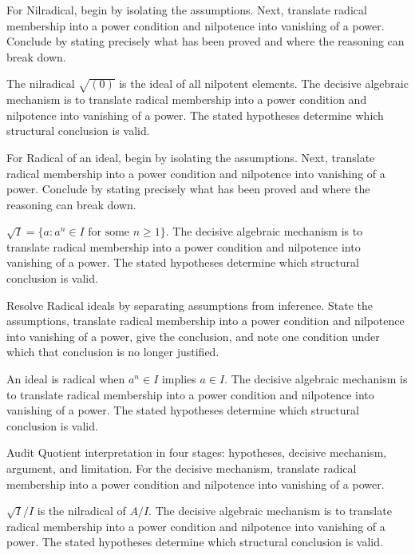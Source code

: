 \begin{problem}\label{prob:v03-problem-02}
For Nilradical, begin by isolating the assumptions. Next, translate radical membership into a power condition and nilpotence into vanishing of a power. Conclude by stating precisely what has been proved and where the reasoning can break down.
\end{problem}
\begin{solution}
The nilradical $\sqrt{(0)}$ is the ideal of all nilpotent elements. The decisive algebraic mechanism is to translate radical membership into a power condition and nilpotence into vanishing of a power. The stated hypotheses determine which structural conclusion is valid.
\end{solution}

\begin{problem}\label{prob:v03-problem-03}
For Radical of an ideal, begin by isolating the assumptions. Next, translate radical membership into a power condition and nilpotence into vanishing of a power. Conclude by stating precisely what has been proved and where the reasoning can break down.
\end{problem}
\begin{solution}
$\sqrt I=\{a:a^n\in I\text{ for some }n\ge1\}$. The decisive algebraic mechanism is to translate radical membership into a power condition and nilpotence into vanishing of a power. The stated hypotheses determine which structural conclusion is valid.
\end{solution}

\begin{problem}\label{prob:v03-problem-04}
Resolve Radical ideals by separating assumptions from inference. State the assumptions, translate radical membership into a power condition and nilpotence into vanishing of a power, give the conclusion, and note one condition under which that conclusion is no longer justified.
\end{problem}
\begin{solution}
An ideal is radical when $a^n\in I$ implies $a\in I$. The decisive algebraic mechanism is to translate radical membership into a power condition and nilpotence into vanishing of a power. The stated hypotheses determine which structural conclusion is valid.
\end{solution}

\begin{problem}\label{prob:v03-problem-05}
Audit Quotient interpretation in four stages: hypotheses, decisive mechanism, argument, and limitation. For the decisive mechanism, translate radical membership into a power condition and nilpotence into vanishing of a power.
\end{problem}
\begin{solution}
$\sqrt I/I$ is the nilradical of $A/I$. The decisive algebraic mechanism is to translate radical membership into a power condition and nilpotence into vanishing of a power. The stated hypotheses determine which structural conclusion is valid.
\end{solution}

